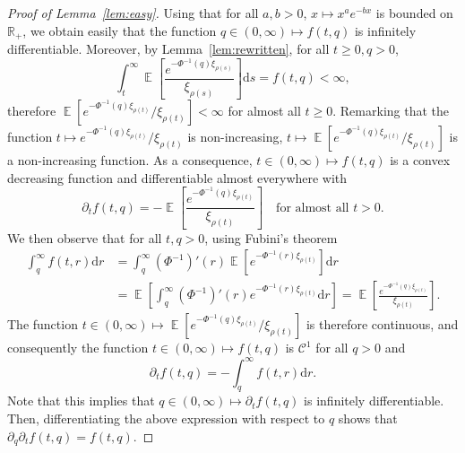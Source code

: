 \documentclass[10pt]{amsart}
\theoremstyle{definition}
\numberwithin{equation}{section}
\newcommand{\R}{\mathbb{R}}
\DeclareMathOperator{\E}{\mathbb{E}}
\newcommand{\dd}{\mathrm{d}}
\newcommand{\calC}{\mathcal{C}}
\begin{document}
\begin{proof}[Proof of Lemma~\ref{lem:easy}]
Using that for all $a,b > 0$, $x \mapsto x^{a} e^{-bx}$ is bounded on $\R_+$, we obtain easily that the function $q \in (0,\infty) \mapsto f(t,q)$ is infinitely differentiable. Moreover, by Lemma~\ref{lem:rewritten}, for all $t \geq 0, q>0$,
\[
\int_t^\infty \E\left[\frac{e^{-\Phi^{-1}(q)\xi_{\rho(s)}}}{\xi_{\rho(s)}} \right] \dd s = f(t,q) < \infty,
\]
therefore $\E[e^{-\Phi^{-1}(q)\xi_{\rho(t)}}/\xi_{\rho(t)}] < \infty$ for almost all $t \geq 0$. Remarking that the function $t \mapsto e^{-\Phi^{-1}(q)\xi_{\rho(t)}}/\xi_{\rho(t)}$ is non-increasing, $t \mapsto \E[e^{-\Phi^{-1}(q)\xi_{\rho(t)}}/{\xi_{\rho(t)}}]$ is a non-increasing function. As a consequence, $t \in (0,\infty) \mapsto f(t,q)$ is a convex decreasing function and differentiable almost everywhere with
\[
\partial_t f(t,q) = -\E\left[\frac{e^{-\Phi^{-1}(q)\xi_{\rho(t)}}}{\xi_{\rho(t)}} \right] \quad \text{for almost all $t > 0$}.
\]
We then observe that for all $t,q > 0$, using Fubini's theorem
\begin{align*}
\int_q^\infty f(t,r) \dd r &= \int_q^\infty (\Phi^{-1})'(r)\E\left[e^{-\Phi^{-1}(r) \xi_{\rho(t)}}\right] \dd r \\
&= \E\left[\int_q^\infty (\Phi^{-1})'(r)e^{-\Phi^{-1}(r) \xi_{\rho(t)}} \dd r \right] = \E\left[\frac{e^{-\Phi^{-1}(q)\xi_{\rho(t)}}}{\xi_{\rho(t)}} \right].
\end{align*}
The function $t \in (0,\infty) \mapsto \E[{e^{-\Phi^{-1}(q)\xi_{\rho(t)}}}/{\xi_{\rho(t)}}]$ is therefore continuous, and consequently the function $t \in (0,\infty) \mapsto f(t,q)$ is $\calC^1$ for all $q > 0$ and
\[
\partial_t f(t,q) = -\int_q^\infty f(t,r) \dd r.
\]
Note that this implies that $q \in (0,\infty) \mapsto \partial_t f(t,q)$ is infinitely differentiable. Then, differentiating the above expression with respect to $q$ shows that $\partial_q \partial_t f(t,q) = f(t,q)$.


\end{proof}
\end{document}
